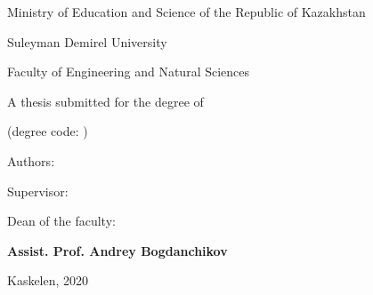 \newpage
\pagestyle{empty}

\begin{center}
\large
Ministry of Education and Science of the Republic of Kazakhstan

Suleyman Demirel University

Faculty of Engineering and Natural Sciences

\vspace{2cm}
\textbf{\mytitle}

\vspace{1cm}
\large
A thesis submitted for the degree of

\mydegree

(degree code: \mydegreecode)

\vspace{2cm}
Authors: \textbf{\myauthor}

\vspace{2cm}
Supervisor: \textbf{\mycoach}

\vspace{2cm}
Dean of the faculty:

\textbf{Assist. Prof. Andrey Bogdanchikov}


\vfill
Kaskelen, 2020
\end{center}